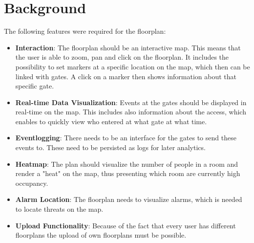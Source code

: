 \section{Background}

The following features were required for the floorplan:

\begin{itemize}[noitemsep]
	\item \textbf{Interaction}:
	The floorplan should be an interactive map. This means that the user is able to zoom, pan and click on the floorplan. It includes the possibility to set markers at a specific location on the map, which then can be linked with gates. A click on a marker then shows information about that specific gate.
	\item \textbf{Real-time Data Visualization}:
	Events at the gates should be displayed in real-time on the map. This includes also information about the access, which enables to quickly view who entered at what gate at what time.
	\item \textbf{Eventlogging}:
	There needs to be an interface for the gates to send these events to. These need to be persisted as logs for later analytics.
	\item \textbf{Heatmap}:
	The plan should visualize the number of people in a room and render a "heat" on the map, thus presenting which room are currently high occupancy.
	\item \textbf{Alarm Location}:
	The floorplan needs to visualize alarms, which is needed to locate threats on the map.
	\item \textbf{Upload Functionality}:
	Because of the fact that every user has different floorplans the upload of own floorplans must be possible.
\end{itemize}

\clearpage